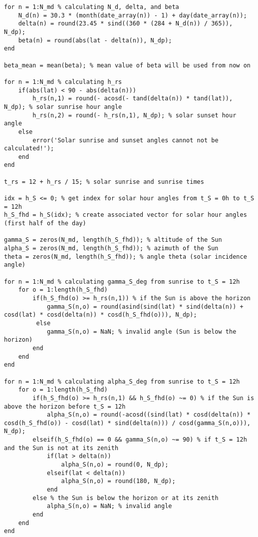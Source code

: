\begin{lstlisting}
for n = 1:N_md % calculating N_d, delta, and beta
    N_d(n) = 30.3 * (month(date_array(n)) - 1) + day(date_array(n));
    delta(n) = round(23.45 * sind((360 * (284 + N_d(n)) / 365)), N_dp);
    beta(n) = round(abs(lat - delta(n)), N_dp);
end

beta_mean = mean(beta); % mean value of beta will be used from now on

for n = 1:N_md % calculating h_rs
    if(abs(lat) < 90 - abs(delta(n)))
        h_rs(n,1) = round(- acosd(- tand(delta(n)) * tand(lat)), N_dp); % solar sunrise hour angle
        h_rs(n,2) = round(- h_rs(n,1), N_dp); % solar sunset hour angle
    else
        error('Solar sunrise and sunset angles cannot not be calculated!');
    end
end

t_rs = 12 + h_rs / 15; % solar sunrise and sunrise times

idx = h_S <= 0; % get index for solar hour angles from t_S = 0h to t_S = 12h
h_S_fhd = h_S(idx); % create associated vector for solar hour angles (first half of the day)

gamma_S = zeros(N_md, length(h_S_fhd)); % altitude of the Sun
alpha_S = zeros(N_md, length(h_S_fhd)); % azimuth of the Sun
theta = zeros(N_md, length(h_S_fhd)); % angle theta (solar incidence angle)

for n = 1:N_md % calculating gamma_S_deg from sunrise to t_S = 12h
    for o = 1:length(h_S_fhd)
        if(h_S_fhd(o) >= h_rs(n,1)) % if the Sun is above the horizon
            gamma_S(n,o) = round(asind(sind(lat) * sind(delta(n)) + cosd(lat) * cosd(delta(n)) * cosd(h_S_fhd(o))), N_dp); 
         else
            gamma_S(n,o) = NaN; % invalid angle (Sun is below the horizon)
        end
    end
end

for n = 1:N_md % calculating alpha_S_deg from sunrise to t_S = 12h
    for o = 1:length(h_S_fhd)
        if(h_S_fhd(o) >= h_rs(n,1) && h_S_fhd(o) ~= 0) % if the Sun is above the horizon before t_S = 12h
            alpha_S(n,o) = round(-acosd((sind(lat) * cosd(delta(n)) * cosd(h_S_fhd(o)) - cosd(lat) * sind(delta(n))) / cosd(gamma_S(n,o))), N_dp); 
        elseif(h_S_fhd(o) == 0 && gamma_S(n,o) ~= 90) % if t_S = 12h and the Sun is not at its zenith
            if(lat > delta(n))
                alpha_S(n,o) = round(0, N_dp);
            elseif(lat < delta(n))
                alpha_S(n,o) = round(180, N_dp);
            end
        else % the Sun is below the horizon or at its zenith
            alpha_S(n,o) = NaN; % invalid angle
        end  
    end
end


\end{lstlisting}
